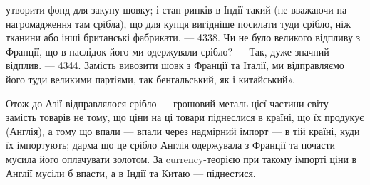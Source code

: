 \parcont{}  %
утворити фонд для закупу шовку; і стан ринків в Індії такий (не вважаючи на
нагромадження там срібла), що для купця вигідніше посилати туди срібло, ніж
тканини або інші британські фабрикати. — 4338. Чи не було великого відпливу
з Франції, що в наслідок його ми одержували срібло? — Так, дуже значний відплив.
— 4344. Замість вивозити шовк з Франції та Італії, ми відправляємо його
туди великими партіями, так бенгальський, як і китайський».

Отож до Азії відправлялося срібло — грошовий металь цієї частини світу —
замість товарів не тому, що ціни на ці товари піднеслися в країні, що їх продукує
(Англія), а тому що впали — впали через надмірний імпорт — в тій країні,
куди їх імпортують; дарма що це срібло Англія одержувала з Франції та почасти
мусила його оплачувати золотом. За currency-теорією при такому імпорті
ціни в Англії мусіли б впасти, а в Індії та Китаю — піднестися.

